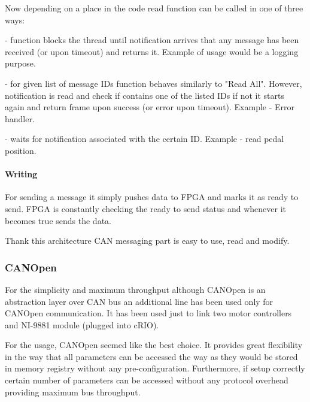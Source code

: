 Now depending on a place in the code read function can be called in one of three ways:
\begin{description}[labelindent=1cm]
    \item[Read All] - function blocks the thread until notification arrives that any message has been received (or upon timeout) and returns it. Example of usage would be a logging purpose.
    \item[Read Some] - for given list of message IDs function behaves similarly to "Read All". However, notification is read and check if contains one of the listed IDs if not it starts again and return frame upon success (or error upon timeout). Example - Error handler.
    \item[Read ID] - waits for notification associated with the certain ID. Example - read pedal position.
    


\end{description}

\paragraph{Writing}
For sending a message it simply pushes data to FPGA and marks it as ready to send. FPGA is constantly checking the ready to send status and whenever it becomes true sends the data.

\vspace{5mm}
\noindent Thank this architecture CAN messaging part is easy to use, read and modify.

\subsubsection{CANOpen}
For the simplicity and maximum throughput although CANOpen is an abstraction layer over CAN bus an additional line has been used only for CANOpen communication. It has been used just to link two motor controllers and NI-9881 module (plugged into cRIO).

For the usage, CANOpen seemed like the best choice. It provides great flexibility in the way that all parameters can be accessed the way as they would be stored in memory registry without any pre-configuration. Furthermore, if setup correctly certain number of parameters can be accessed without any protocol overhead providing maximum bus throughput.


